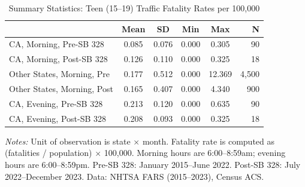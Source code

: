 \begin{table}[htbp]
\centering
\caption{Summary Statistics: Teen (15--19) Traffic Fatality Rates per 100,000}
\label{tab:summary}
\begin{threeparttable}
\begin{tabular}{lccccr}
\toprule
 & Mean & SD & Min & Max & N \\
\midrule
CA, Morning, Pre-SB 328 & 0.085 & 0.076 & 0.000 & 0.305 & 90 \\
CA, Morning, Post-SB 328 & 0.126 & 0.110 & 0.000 & 0.325 & 18 \\
Other States, Morning, Pre & 0.177 & 0.512 & 0.000 & 12.369 & 4,500 \\
Other States, Morning, Post & 0.165 & 0.407 & 0.000 & 4.340 & 900 \\
\midrule
CA, Evening, Pre-SB 328 & 0.213 & 0.120 & 0.000 & 0.635 & 90 \\
CA, Evening, Post-SB 328 & 0.208 & 0.093 & 0.000 & 0.325 & 18 \\
\bottomrule
\end{tabular}
\begin{tablenotes}[flushleft]
\small
\item \textit{Notes:} Unit of observation is state $\times$ month. Fatality rate is computed as (fatalities / population) $\times$ 100,000. Morning hours are 6:00--8:59am; evening hours are 6:00--8:59pm. Pre-SB 328: January 2015--June 2022. Post-SB 328: July 2022--December 2023. Data: NHTSA FARS (2015--2023), Census ACS.
\end{tablenotes}
\end{threeparttable}
\end{table}

